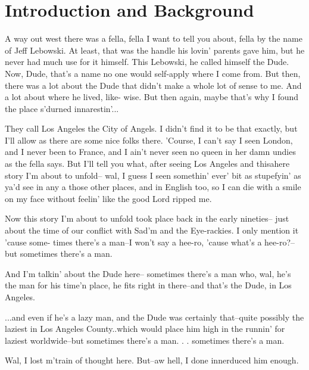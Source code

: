 \chapter{Introduction and Background}
\label{chap:intro}

A way out west there was a fella, 
fella I want to tell you about, fella 
by the name of Jeff Lebowski. At 
least, that was the handle his lovin' 
parents gave him, but he never had 
much use for it himself. This 
Lebowski, he called himself the Dude. 
Now, Dude, that's a name no one would 
self-apply where I come from. But 
then, there was a lot about the Dude 
that didn't make a whole lot of sense 
to me. And a lot about where he 
lived, like- wise. But then again, 
maybe that's why I found the place 
s'durned innarestin'...

They call Los Angeles the City of 
Angels. I didn't find it to be that 
exactly, but I'll allow as there are 
some nice folks there. 'Course, I 
can't say I seen London, and I never 
been to France, and I ain't never 
seen no queen in her damn undies as 
the fella says. But I'll tell you 
what, after seeing Los Angeles and 
thisahere story I'm about to unfold--
wal, I guess I seen somethin' ever' 
bit as stupefyin' as ya'd see in any 
a those other places, and in English 
too, so I can die with a smile on my 
face without feelin' like the good 
Lord ripped me.

Now this story I'm about to unfold 
took place back in the early nineties--
just about the time of our conflict 
with Sad'm and the Eye-rackies. I 
only mention it 'cause some- times 
there's a man--I won't say a hee-ro, 
'cause what's a hee-ro?--but sometimes 
there's a man.

And I'm talkin' about the Dude here-- 
sometimes there's a man who, wal, 
he's the man for his time'n place, 
he fits right in there--and that's 
the Dude, in Los Angeles.

...and even if he's a lazy man, and 
the Dude was certainly that--quite 
possibly the laziest in Los Angeles 
County..which would place him high in the 
runnin' for laziest worldwide--but 
sometimes there's a man. . . sometimes 
there's a man.

Wal, I lost m'train of thought here. 
But--aw hell, I done innerduced him 
enough.
